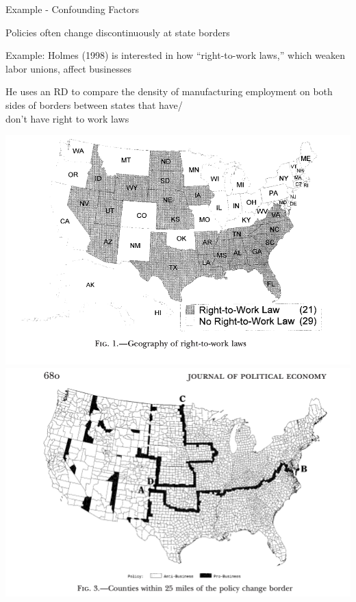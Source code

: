 \documentclass[11pt,english,handout]{beamer}
\newenvironment{wideitemize}{\itemize\addtolength{\itemsep}{10pt}}{\enditemize}
\begin{document}
\begin{frame}{Example - Confounding Factors}
	\begin{wideitemize}
		\item
		Policies often change discontinuously at state borders
		
		\pause
		\item
		Example: Holmes (1998) is interested in how ``right-to-work laws,'' which weaken labor unions, affect businesses
		
		\pause
		\item
		He uses an RD to compare the density of manufacturing employment on both sides of borders between states that have/ \\ don't have right to work laws
	\end{wideitemize}
\end{frame}
	
	
\begin{frame}
\begin{center}
\includegraphics[width = 0.55\linewidth]{rtw-figure-2}\\
\includegraphics[width = 0.55\linewidth]{rtw-figure-1}	
\end{center}
\end{frame}	
\end{document}
